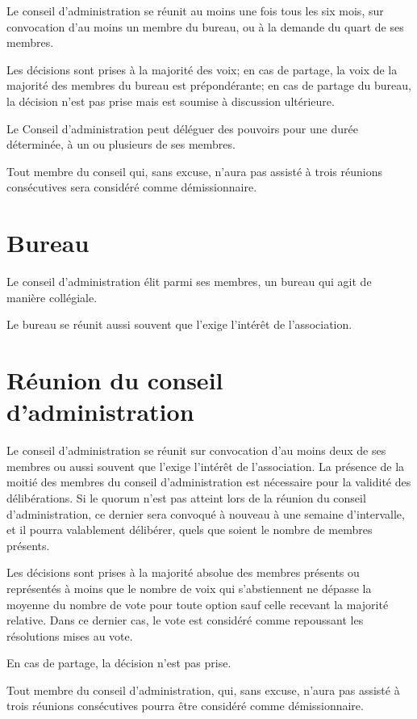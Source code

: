 \documentclass[12 pt]{article}
\begin{document}
Le conseil d’administration se réunit au moins une fois tous les six
mois, sur convocation d’au moins un membre du bureau, ou à la demande
du quart de ses membres.

Les décisions sont prises à la majorité des voix; en cas de partage,
la voix de la majorité des membres du bureau est prépondérante; en cas
de partage du bureau, la décision n’est pas prise mais est soumise à
discussion ultérieure.

Le Conseil d’administration peut déléguer des pouvoirs pour une durée
déterminée, à un ou plusieurs de ses membres.

Tout membre du conseil qui, sans excuse, n’aura pas assisté à trois
réunions consécutives sera considéré comme démissionnaire.

\section{Bureau}
\label{sec:reunion-du-bureau}

Le conseil d’administration élit parmi ses membres, un bureau qui agit
de manière collégiale.

Le bureau se réunit aussi souvent que l'exige l'intérêt de
l'association.

\section{Réunion du conseil d'administration}
\label{sec:reunion-du-conseil-d-administration}

Le conseil d'administration se réunit sur convocation d'au moins deux
de ses membres ou aussi souvent que l'exige l'intérêt de
l'association. La présence de la moitié des membres du conseil
d'administration est nécessaire pour la validité des délibérations. Si
le quorum n'est pas atteint lors de la réunion du conseil
d'administration, ce dernier sera convoqué à nouveau à une semaine
d'intervalle, et il pourra valablement délibérer, quels que soient le
nombre de membres présents.

Les décisions sont prises à la majorité absolue des membres présents
ou représentés à moins que le nombre de voix qui s'abstiennent ne dépasse
la moyenne du nombre de vote pour toute option sauf celle recevant la
majorité relative.  Dans ce dernier cas, le vote est considéré comme
repoussant les résolutions mises au vote.

En cas de partage, la décision n'est pas prise.

Tout membre du conseil d'administration, qui, sans excuse, n'aura pas
assisté à trois réunions consécutives pourra être considéré comme
démissionnaire.
\end{document}
